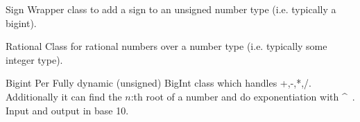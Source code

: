 
\begin{algorithm}{Sign}
\desc
Wrapper class to add a sign to an unsigned number type (i.e. typically
a bigint).
\end{algorithm}

\begin{algorithm}{Rational}
\desc
Class for rational numbers over a number type (i.e. typically some
integer type).
\end{algorithm}

\begin{algorithm}{Bigint Per}
\desc
Fully dynamic (unsigned) BigInt class which handles
+,-,*,/. Additionally it can find the $n$:th root of a number and do
exponentiation with \^~. Input and output in base 10.
\end{algorithm}

